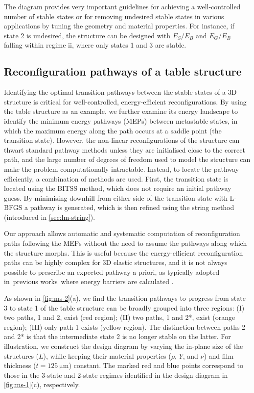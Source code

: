 The diagram provides very important guidelines for achieving a well-controlled number of stable states or for removing undesired stable states in various applications by tuning the geometry and material properties.
For instance, if state 2 is undesired, the structure can be designed with $E_S/E_B$ and $E_G/E_B$ falling within regime ii, where only states 1 and 3 are stable.


\subsection{Reconfiguration pathways of a table structure}

Identifying the optimal transition pathways between the stable states of a 3D structure is critical for well-controlled, energy-efficient reconfigurations.
By using the table structure as an example, we further examine its energy landscape to identify the minimum energy pathways (MEPs) between metastable states, in which the maximum energy along the path occurs at a saddle point (the transition state).
However, the non-linear reconfigurations of the structure can thwart standard pathway methods unless they are initialised close to the correct path, and the large number of degrees of freedom used to model the structure can make the problem computationally intractable.
Instead, to locate the pathway efficiently, a combination of methods are used.
First, the transition state is located using the BITSS method, which does not require an initial pathway guess.
By minimising downhill from either side of the transition state with L-BFGS a pathway is generated, which is then refined using the string method (introduced in \cref{sec:lm-string}).

Our approach allows automatic and systematic computation of reconfiguration paths following the MEPs without the need to assume the pathways along which the structure morphs.
This is useful because the energy-efficient reconfiguration paths can be highly complex for 3D elastic structures, and it is not always possible to prescribe an expected pathway a priori, as typically adopted in previous works where energy barriers are calculated \cite{Fang2017,Fu2018,Virot2017,Shang2018}.

As shown in \cref{fig:ms-2}(a), we find the transition pathways to progress from state 3 to state 1 of the table structure can be broadly grouped into three regions: (I) two paths, 1 and 2, exist (red region); (II) two paths, 1 and 2*, exist (orange region); (III) only path 1 exists (yellow region).
The distinction between paths 2 and 2* is that the intermediate state 2 is no longer stable on the latter.
For illustration, we construct the design diagram by varying the in-plane size of the structures ($L$), while keeping their material properties ($\rho$, $Y$, and $\nu$) and film thickness ($t=\SI{125}{\micro\meter}$) constant.
The marked red and blue points correspond to those in the 3-state and 2-state regimes identified in the design diagram in \cref{fig:ms-1}(c), respectively.

